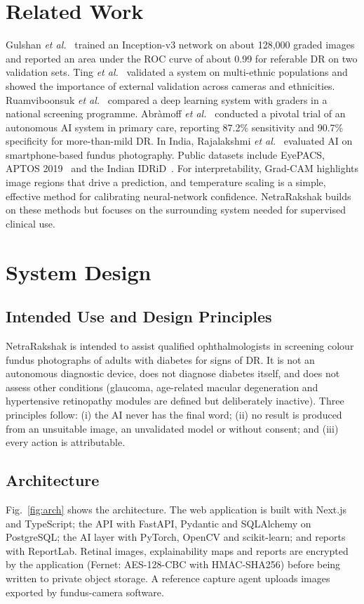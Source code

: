 \documentclass[conference]{IEEEtran}
\begin{document}
\section{Related Work}
Gulshan \textit{et al.}~\cite{gulshan2016} trained an Inception-v3 network on about 128,000 graded images and reported an
area under the ROC curve of about 0.99 for referable DR on two validation sets. Ting \textit{et al.}~\cite{ting2017}
validated a system on multi-ethnic populations and showed the importance of external validation across cameras and
ethnicities. Ruamviboonsuk \textit{et al.}~\cite{ruamviboonsuk2019} compared a deep learning system with graders in a
national screening programme. Abr\`amoff \textit{et al.}~\cite{abramoff2018} conducted a pivotal trial of an autonomous
AI system in primary care, reporting 87.2\% sensitivity and 90.7\% specificity for more-than-mild DR. In India,
Rajalakshmi \textit{et al.}~\cite{rajalakshmi2018} evaluated AI on smartphone-based fundus photography. Public datasets
include EyePACS, APTOS 2019~\cite{aptos2019} and the Indian IDRiD~\cite{porwal2018}. For interpretability, Grad-CAM
\cite{selvaraju2017} highlights image regions that drive a prediction, and temperature scaling \cite{guo2017} is a
simple, effective method for calibrating neural-network confidence. NetraRakshak builds on these methods but focuses on
the surrounding system needed for supervised clinical use.

\section{System Design}
\subsection{Intended Use and Design Principles}
NetraRakshak is intended to assist qualified ophthalmologists in screening colour fundus photographs of adults with
diabetes for signs of DR. It is not an autonomous diagnostic device, does not diagnose diabetes itself, and does not
assess other conditions (glaucoma, age-related macular degeneration and hypertensive retinopathy modules are defined
but deliberately inactive). Three principles follow: (i) the AI never has the final word; (ii) no result is produced
from an unsuitable image, an unvalidated model or without consent; and (iii) every action is attributable.

\subsection{Architecture}
Fig.~\ref{fig:arch} shows the architecture. The web application is built with Next.js and TypeScript; the API with
FastAPI, Pydantic and SQLAlchemy on PostgreSQL; the AI layer with PyTorch, OpenCV and scikit-learn; and reports with
ReportLab. Retinal images, explainability maps and reports are encrypted by the application (Fernet: AES-128-CBC with
HMAC-SHA256) before being written to private object storage. A reference capture agent uploads images exported by
fundus-camera software.
\end{document}
